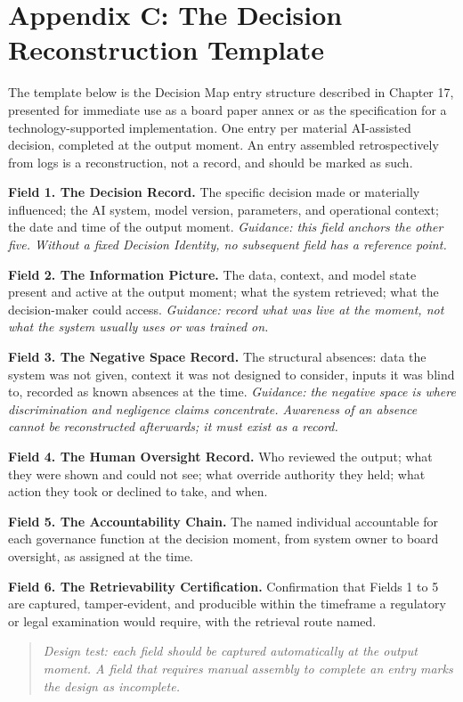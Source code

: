
\chapter*{Appendix C: The Decision Reconstruction Template}

The template below is the Decision Map entry structure described in Chapter 17, presented for immediate use as a board paper annex or as the specification for a technology-supported implementation. One entry per material AI-assisted decision, completed at the output moment. An entry assembled retrospectively from logs is a reconstruction, not a record, and should be marked as such.

\textbf{Field 1. The Decision Record.} The specific decision made or materially influenced; the AI system, model version, parameters, and operational context; the date and time of the output moment. \emph{Guidance: this field anchors the other five. Without a fixed Decision Identity, no subsequent field has a reference point.}

\textbf{Field 2. The Information Picture.} The data, context, and model state present and active at the output moment; what the system retrieved; what the decision-maker could access. \emph{Guidance: record what was live at the moment, not what the system usually uses or was trained on.}

\textbf{Field 3. The Negative Space Record.} The structural absences: data the system was not given, context it was not designed to consider, inputs it was blind to, recorded as known absences at the time. \emph{Guidance: the negative space is where discrimination and negligence claims concentrate. Awareness of an absence cannot be reconstructed afterwards; it must exist as a record.}

\textbf{Field 4. The Human Oversight Record.} Who reviewed the output; what they were shown and could not see; what override authority they held; what action they took or declined to take, and when.

\textbf{Field 5. The Accountability Chain.} The named individual accountable for each governance function at the decision moment, from system owner to board oversight, as assigned at the time.

\textbf{Field 6. The Retrievability Certification.} Confirmation that Fields 1 to 5 are captured, tamper-evident, and producible within the timeframe a regulatory or legal examination would require, with the retrieval route named.

\begin{quote}
\emph{Design test: each field should be captured automatically at the output moment. A field that requires manual assembly to complete an entry marks the design as incomplete.}
\end{quote}
